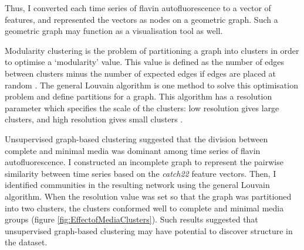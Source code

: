 Thus, I converted each time series of flavin autofluorescence to a vector of features, and represented the vectors as nodes on a geometric graph.
Such a geometric graph may function as a visualisation tool as well.


Modularity clustering is the problem of partitioning a graph into clusters in order to optimise a `modularity' value.
This value is defined as the number of edges between clusters minus the number of expected edges if edges are placed at random \parencite{newmanModularityCommunityStructure2006}.
The general Louvain algorithm \parencite{blondelFastUnfoldingCommunities2008,muchaCommunityStructureTimeDependent2010} is one method to solve this optimisation problem and define partitions for a graph.
This algorithm has a resolution parameter which specifies the scale of the clusters: low resolution gives large clusters, and high resolution gives small clusters \parencite{fortunatoResolutionLimitCommunity2007}.

Unsupervised graph-based clustering suggested that the division between complete and minimal media was dominant among time series of flavin autofluorescence. %
I constructed an incomplete graph to represent the pairwise similarity between time series based on the \textit{catch22} feature vectors.
Then, I identified communities in the resulting network using the general Louvain algorithm.
When the resolution value was set so that the graph was partitioned into two clusters, the clusters conformed well to complete and minimal media groups (figure \ref{fig:EffectofMediaClusters}). %
Such results suggested that unsupervised graph-based clustering may have potential to discover structure in the dataset.


